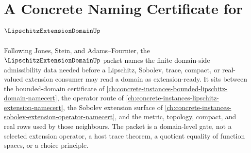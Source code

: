 \chapter{A Concrete Naming Certificate for $\LipschitzExtensionDomainUp$}
\label{ch:concrete-instances-lipschitz-extension-domain-namecert}

Following Jones, Stein, and Adams--Fournier, the $\LipschitzExtensionDomainUp$ packet names the finite domain-side admissibility data needed before a Lipschitz, Sobolev, trace, compact, or real-valued extension consumer may read a domain as extension-ready. It sits between the bounded-domain certificate of \autoref{ch:concrete-instances-bounded-lipschitz-domain-namecert}, the operator route of \autoref{ch:concrete-instances-lipschitz-extension-namecert}, the Sobolev extension surface of \autoref{ch:concrete-instances-sobolev-extension-operator-namecert}, and the metric, topology, compact, and real rows used by those neighbours. The packet is a domain-level gate, not a selected extension operator, a host trace theorem, a quotient equality of function spaces, or a choice principle.

